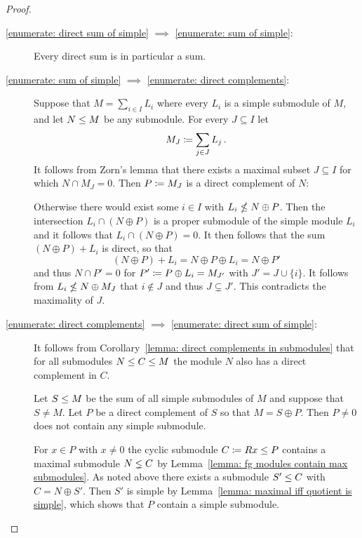 

\begin{proof}
  \leavevmode
  \begin{description}
    \item[\ref*{enumerate: direct sum of simple} $\implies$ \ref*{enumerate: sum of simple}:]
      Every direct sum is in particular a sum.
    \item[\ref*{enumerate: sum of simple} $\implies$ \ref*{enumerate: direct complements}:]
      Suppose that $M = \sum_{i \in I} L_i$ where every $L_i$ is a simple submodule of $M$, and let $N \leq M$ be any submodule.
      For every $J \subseteq I$ let
      \[
                  M_J
        \coloneqq  \sum_{j \in J} L_j \,.
      \]
      It follows from Zorn’s lemma that there exists a maximal subset $J \subseteq I$ for which $N \cap M_J = 0$.
      Then $P \coloneqq M_J$ is a direct complement of $N$:
      
      Otherwise there would exist some $i \in I$ with $L_i \nleq N \oplus P$.
      Then the intersection $L_i \cap (N \oplus P)$ is a proper submodule of the simple module $L_i$ and it follows that $L_i \cap (N \oplus P) = 0$.
      It then follows that the sum $(N \oplus P) + L_i$ is direct, so that
      \[
          (N \oplus P) + L_i
        = N \oplus P \oplus L_i
        = N \oplus P'
      \]
      and thus $N \cap P' = 0$ for $P' \coloneqq P \oplus L_i = M_{J'}$ with $J' = J \cup \{i\}$.
      It follows from $L_i \nleq N \oplus M_J$ that $i \notin J$ and thus $J \subsetneq J'$.
      This contradicts the maximality of $J$.
    \item[\ref*{enumerate: direct complements} $\implies$ \ref*{enumerate: direct sum of simple}:]
      It follows from Corollary~\ref{lemma: direct complements in submodules} that for all submodules $N \leq C \leq M$ the module $N$ also has a direct complement in $C$.
      
      Let $S \leq M$ be the sum of all simple submodules of $M$ and suppose that $S \neq M$.
      Let $P$ be a direct complement of $S$ so that $M = S \oplus P$.
      Then $P \neq 0$ does not contain any simple submodule.
      
      For $x \in P$ with $x \neq 0$ the cyclic submodule $C \coloneqq Rx \leq P$ contains a maximal submodule $N \lneq C$ by Lemma~\ref{lemma: fg modules contain max submodules}.
      As noted above there exists a submodule $S' \leq C$ with $C = N \oplus S'$.
      Then $S'$ is simple by Lemma~\ref{lemma: maximal iff quotient is simple}, which shows that $P$ contain a simple submodule.
    \qedhere
  \end{description}
\end{proof}


